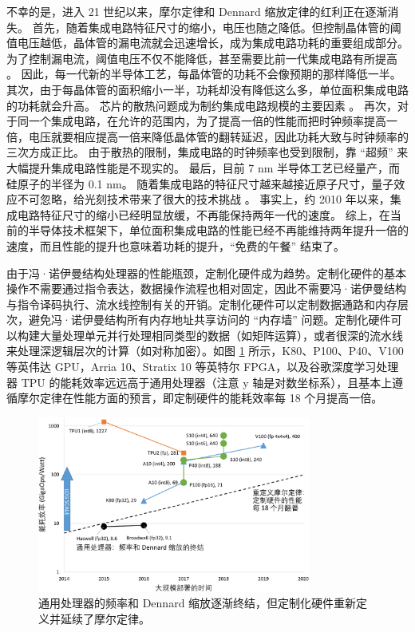 不幸的是，进入 21 世纪以来，摩尔定律和 Dennard 缩放定律的红利正在逐渐消失。
首先，随着集成电路特征尺寸的缩小，电压也随之降低。但控制晶体管的阈值电压越低，晶体管的漏电流就会迅速增长，成为集成电路功耗的重要组成部分。
为了控制漏电流，阈值电压不仅不能降低，甚至需要比前一代集成电路有所提高 \cite{borkar1999design}。
因此，每一代新的半导体工艺，每晶体管的功耗不会像预期的那样降低一半。
其次，由于每晶体管的面积缩小一半，功耗却没有降低这么多，单位面积集成电路的功耗就会升高。
芯片的散热问题成为制约集成电路规模的主要因素 \cite{borkar2011future}。
再次，对于同一个集成电路，在允许的范围内，为了提高一倍的性能而把时钟频率提高一倍，电压就要相应提高一倍来降低晶体管的翻转延迟，因此功耗大致与时钟频率的三次方成正比。
由于散热的限制，集成电路的时钟频率也受到限制，靠 ``超频'' 来大幅提升集成电路性能是不现实的。
最后，目前 7 nm 半导体工艺已经量产，而硅原子的半径为 0.1 nm。
随着集成电路的特征尺寸越来越接近原子尺寸，量子效应不可忽略，给光刻技术带来了很大的技术挑战 \cite{borkar2011future}。
事实上，约 2010 年以来，集成电路特征尺寸的缩小已经明显放缓，不再能保持两年一代的速度。
综上，在当前的半导体技术框架下，单位面积集成电路的性能已经不再能维持两年提升一倍的速度，而且性能的提升也意味着功耗的提升，``免费的午餐'' 结束了。

由于冯·诺伊曼结构处理器的性能瓶颈，定制化硬件成为趋势。定制化硬件的基本操作不需要通过指令表达，数据操作流程也相对固定，因此不需要冯·诺伊曼结构与指令译码执行、流水线控制有关的开销。定制化硬件可以定制数据通路和内存层次，避免冯·诺伊曼结构所有内存地址共享访问的 ``内存墙'' 问题。定制化硬件可以构建大量处理单元并行处理相同类型的数据（如矩阵运算），或者很深的流水线来处理深逻辑层次的计算（如对称加密）。如图 \ref{background:fig:moores_law_redefined} 所示，K80、P100、P40、V100 等英伟达 GPU，Arria 10、Stratix 10 等英特尔 FPGA，以及谷歌深度学习处理器 TPU 的能耗效率远远高于通用处理器（注意 y 轴是对数坐标系），且基本上遵循摩尔定律在性能方面的预言，即定制硬件的能耗效率每 18 个月提高一倍。

\begin{figure}[htbp]
	\centering
	\includegraphics[width=0.8\textwidth]{figures/moores_law_redefined.pdf}
	\caption{通用处理器的频率和 Dennard 缩放逐渐终结，但定制化硬件重新定义并延续了摩尔定律。}
	\label{background:fig:moores_law_redefined}
\end{figure}


